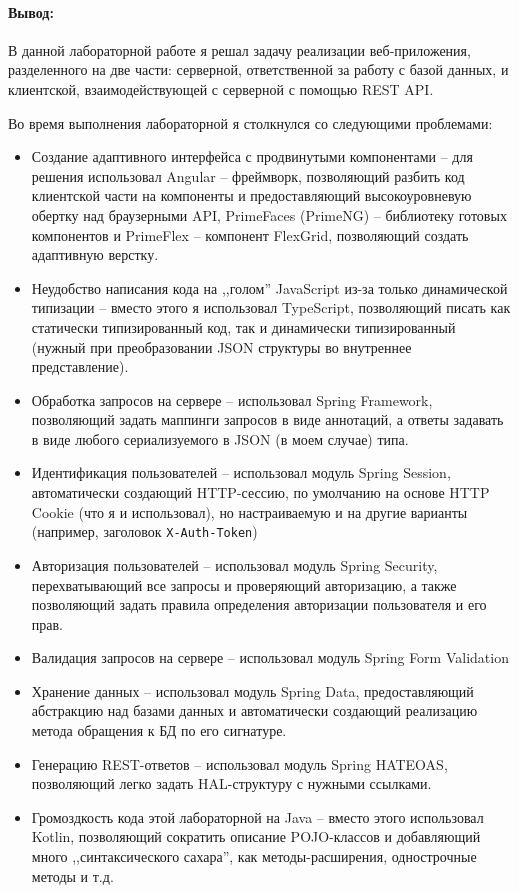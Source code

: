 \paragraph{Вывод:}

В данной лабораторной работе я решал задачу реализации веб-приложения, разделенного на две части:
серверной, ответственной за работу с базой данных,
и клиентской, взаимодействующей с серверной с помощью REST API\@.

Во время выполнения лабораторной я столкнулся со следующими проблемами:
\begin{itemize}
    \item Создание адаптивного интерфейса с продвинутыми компонентами -- для решения использовал
    Angular -- фреймворк, позволяющий разбить код клиентской части на компоненты и предоставляющий
    высокоуровневую обертку над браузерными API,
    PrimeFaces (PrimeNG) -- библиотеку готовых компонентов
    и PrimeFlex -- компонент FlexGrid, позволяющий создать адаптивную верстку.
    \item Неудобство написания кода на ,,голом'' JavaScript из-за только динамической типизации --
    вместо этого я использовал TypeScript, позволяющий писать как статически типизированный код,
    так и динамически типизированный (нужный при преобразовании JSON структуры во внутреннее представление).

    \item Обработка запросов на сервере -- использовал Spring Framework,
    позволяющий задать маппинги запросов в виде аннотаций, а ответы задавать в виде любого сериализуемого в JSON
    (в моем случае) типа.
    \item Идентификация пользователей -- использовал модуль Spring Session, автоматически создающий HTTP-сессию,
    по умолчанию на основе HTTP Cookie (что я и использовал), но настраиваемую и на другие варианты
    (например, заголовок \texttt{X-Auth-Token})
    \item Авторизация пользователей -- использовал модуль Spring Security, перехватывающий все запросы и проверяющий
    авторизацию, а также позволяющий задать правила определения авторизации пользователя и его прав.
    \item Валидация запросов на сервере -- использовал модуль Spring Form Validation
    \item Хранение данных -- использовал модуль Spring Data, предоставляющий абстракцию над базами данных и
    автоматически создающий реализацию метода обращения к БД по его сигнатуре.
    \item Генерацию REST-ответов -- использовал модуль Spring HATEOAS, позволяющий легко задать HAL-структуру с
    нужными ссылками.

    \item Громоздкость кода этой лабораторной на Java -- вместо этого использовал Kotlin, позволяющий сократить
    описание POJO-классов и добавляющий много ,,синтаксического сахара'', как методы-расширения, однострочные методы и т.д.
\end{itemize}
